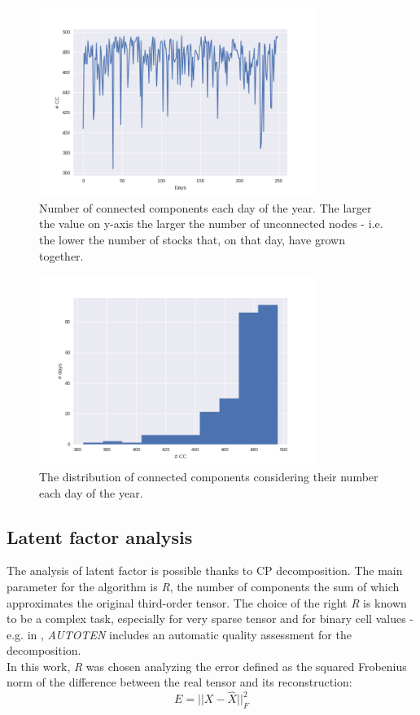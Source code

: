 \documentclass[12pt]{extarticle}
\begin{document}
\begin{figure}[!h]
	\centering
	\includegraphics[width=0.8\textwidth]{cc_by_time.png}
	\caption{Number of connected components each day of the year. The larger the value on y-axis the larger the number of unconnected nodes - i.e. the lower the number of stocks that, on that day, have grown together.} 
	\label{fig:cc_by_time}
\end{figure}

\begin{figure}[!h]
	\centering
	\includegraphics[width=0.8\textwidth]{cc_distribution.png}
	\caption{The distribution of connected components considering their number each day of the year.} 
	\label{fig:cc_distribution}
\end{figure}

\subsection{Latent factor analysis}

The analysis of latent factor is possible thanks to CP decomposition. The main parameter for the algorithm is \textit{R}, the number of components the sum of which approximates the original third-order tensor. The choice of the right \textit{R} is known to be a complex task, especially for very sparse tensor and for binary cell values - e.g. in \cite{papalexakis2016automatic}, \textit{AUTOTEN} includes an automatic quality assessment for the decomposition.\\
In this work, \textit{R} was chosen analyzing the error defined as the squared Frobenius norm of the difference between the real tensor and its reconstruction:
$$
	E = || X - \hat{X} ||^2_F
$$
\end{document}
